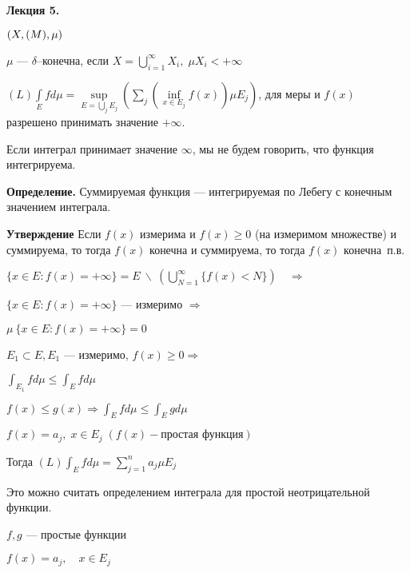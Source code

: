 

\begin{center}
\textbf{Лекция 5.}
\end{center}


$(X, \EuScript(M), \mu)$

$\mu$ --- $\delta$--конечна, если $X = \bigcup_{i = 1}^\infty X_i,
\; \mu X_i < +\infty$

$(L) \int\limits_{E} f d\mu = \sup\limits_{E = \bigcup_j E_j}
\left( \sum\limits_j (\inf\limits_{x \in E_j} f(x)) \mu E_j
\right)$, для меры и $f(x)$ разрешено принимать значение
$+\infty$.
%
%
%
%
%
%
%
%
%
%
%
%

Если интеграл принимает значение $\infty$, мы не будем говорить,
что функция интегрируема.

\textbf{Определение.} \quad Суммируемая функция --- интегрируемая
по Лебегу с конечным значением интеграла.

\textbf{Утверждение} \quad Если $f(x)$ измерима и $f(x) \geqslant
0$ (на измеримом множестве) и суммируема, то тогда $f(x)$ конечна
и суммируема, то тогда $f(x)$ конечна~п.в.

$\{ x \in E : f(x) = + \infty \} = E \: \backslash \: (\bigcup_{N
= 1}^\infty \{ f(x) < N \}) \quad \Rightarrow$

$\{ x \in E : f(x) = + \infty \}$ --- измеримо $\Rightarrow$

$\mu \: \{ x \in E : f(x) = + \infty \} = 0$

$E_1 \subset E, E_1$ --- измеримо, $f(x) \geqslant 0 \Rightarrow$

$\int_{E_1} f d\mu \leqslant \int_E f d\mu$

$f(x) \leqslant g(x) \Rightarrow \int_E f d\mu \leqslant \int_E g
d\mu$

$f(x) = a_j, \; x \in E_j \; (f(x) - \text{простая функция}) $

Тогда $(L) \int_E f d\mu = \sum_{j = 1}^n a_j \mu E_j$

Это можно считать определением интеграла для простой
неотрицательной функции.

$f, g$ --- простые функции

$f(x) = a_j, \quad x \in E_j$

